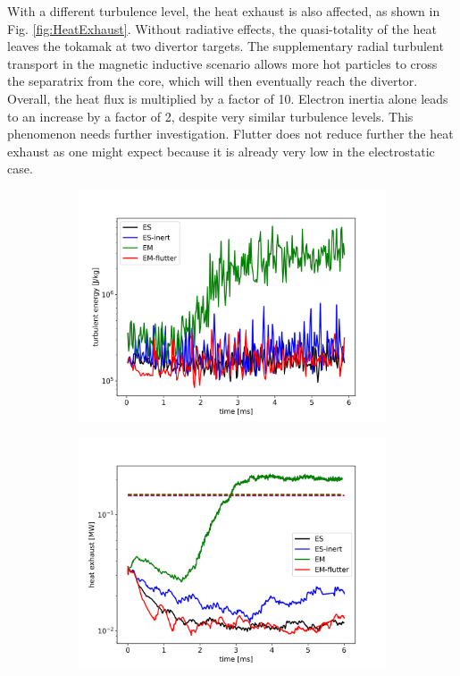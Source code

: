 With a different turbulence level, the heat exhaust is also affected, as shown in Fig. \ref{fig:HeatExhaust}. Without radiative effects, the quasi-totality of the heat leaves the tokamak at two divertor targets. The supplementary radial turbulent transport in the magnetic inductive scenario allows more hot particles to cross the separatrix from the core, which will then eventually reach the divertor. Overall, the heat flux is multiplied by a factor of 10. Electron inertia alone leads to an increase by a factor of 2, despite very similar turbulence levels. This phenomenon needs further investigation. Flutter does not reduce further the heat exhaust as one might expect because it is already very low in the electrostatic case. \newline

\begin{figure}[H]\centering
	\begin{subfigure}[t]{0.45\textwidth}
		\centering
		\includegraphics[width=1\textwidth]{schemes/Eturb_sep.png}
		\label{fig:KE_ExB}
	\end{subfigure}
	\begin{subfigure}[t]{0.45\textwidth}
		\centering
		\includegraphics[width=1\textwidth]{schemes/heatExhaust_noNeutr.jpg}

\end{subfigure}
\end{figure}
